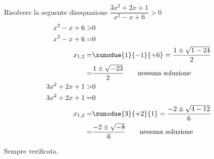 Risolvere la seguente disequazione $\dfrac{3x^2+2x+1}{x^2-x+6}> 0$
\begin{align*}
x^2-x+6>&0\\
x^2-x+6=&0\\
x_{1,2}=&\xunodue{1}{-1}{+6}=\dfrac{1\pm\sqrt{1-24}}{2}\\
=&\dfrac{1\pm\sqrt{-23}}{2}
\qquad\text{nessuna soluzione}\\
3x^2+2x+1>&0\\
3x^2+2x+1=&0\\
x_{1,2}=&\xunodue{3}{+2}{1}=\dfrac{-2\pm\sqrt{4-12}}{6}\\
=&\dfrac{-2\pm\sqrt{-8}}{6}
\qquad\text{nessuna soluzione}\\
\end{align*}
\begin{center}
	
\end{center}
Sempre verificata.
